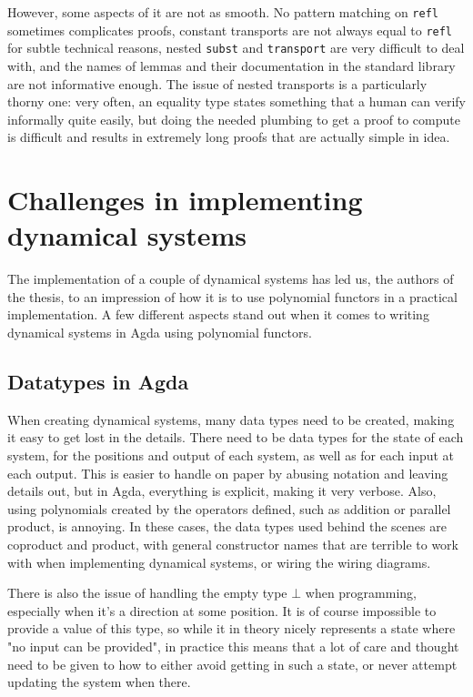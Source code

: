 However, some aspects of it are not as smooth. No pattern matching on \texttt{refl} sometimes complicates proofs, constant transports are not always equal to \texttt{refl} for subtle technical reasons, nested \texttt{subst} and \texttt{transport} are very difficult to deal with, and the names of lemmas and their documentation in the standard library are not informative enough. The issue of nested transports is a particularly thorny one: very often, an equality type states something that a human can verify informally quite easily, but doing the needed plumbing to get a proof to compute is difficult and results in extremely long proofs that are actually simple in idea.

\section{Challenges in implementing dynamical systems}
The implementation of a couple of dynamical systems has led us, the authors of the thesis, to an impression of how it is to use polynomial functors in a practical implementation. A few different aspects stand out when it comes to writing dynamical systems in Agda using polynomial functors.

\subsection{Datatypes in Agda}

When creating dynamical systems, many data types need to be created, making it easy to get lost in the details. There need to be data types for the state of each system, for the positions and output of each system, as well as for each input at each output. This is easier to handle on paper by abusing notation and leaving details out, but in Agda, everything is explicit, making it very verbose. Also, using polynomials created by the operators defined, such as addition or parallel product, is annoying. In these cases, the data types used behind the scenes are coproduct and product, with general constructor names that are terrible to work with when implementing dynamical systems, or wiring the wiring diagrams.

There is also the issue of handling the empty type $\bot$ when programming, especially when it's a direction at some position. It is of course impossible to provide a value of this type, so while it in theory nicely represents a state where "no input can be provided", in practice this means that a lot of care and thought need to be given to how to either avoid getting in such a state, or never attempt updating the system when there.

